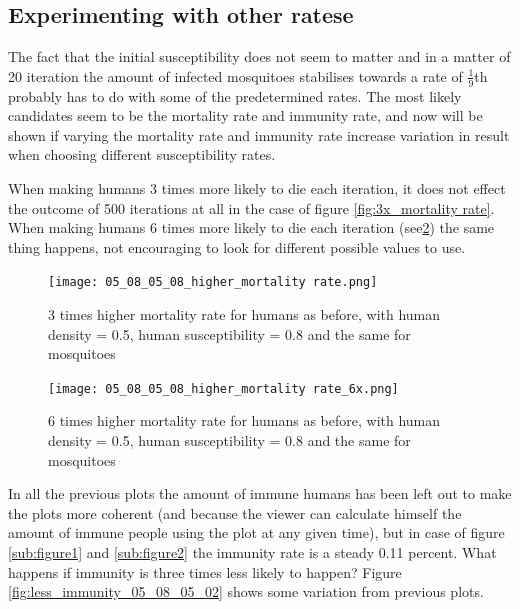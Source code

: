 \documentclass[a4paper]{report}
\begin{document}
\FloatBarrier
\subsection{Experimenting with other ratese}
The fact that the initial susceptibility does not seem to matter and in a matter
of 20 iteration the amount of infected mosquitoes stabilises towards a rate of
$\frac{1}{9}$th probably has to do with some of the predetermined rates. The most likely
candidates seem to be the mortality rate and immunity rate, and now will be shown if
varying the mortality rate and immunity rate increase variation in result when
choosing different susceptibility rates.

When making humans 3 times more likely to die each iteration, it does not effect
the outcome of 500 iterations at all in the case of  figure
\ref{fig:3x_mortality rate}. When making humans 6 times more likely to die each iteration
(see\ref{fig:2_more_mosquitoes}) the same thing
happens, not encouraging to look for different possible values to use.

\begin{figure}[htbp]
    \centering
    \texttt{[image: 05\_08\_05\_08\_higher\_mortality rate.png]}
    \caption{3 times higher mortality rate for humans as before, with human density =
        0.5, human susceptibility = 0.8 and the same for mosquitoes
    }
    \label{fig:more_mosquitoes}
\end{figure}

\begin{figure}[htbp]
    \centering
    \texttt{[image: 05\_08\_05\_08\_higher\_mortality rate\_6x.png]}
    \caption{6 times higher mortality rate for humans as before, with human density =
        0.5, human susceptibility = 0.8 and the same for mosquitoes
    }
    \label{fig:2_more_mosquitoes}
\end{figure}

In all the previous plots the amount of immune humans has been left out to make
the plots more coherent (and because the viewer can calculate himself the amount
of immune people using the plot at any given time), but in case of figure
\ref{sub:figure1} and \ref{sub:figure2} the immunity rate is a steady 0.11
percent. What happens if immunity is three times less likely to happen? Figure
\ref{fig:less_immunity_05_08_05_02} shows some variation from previous plots.
\end{document}

